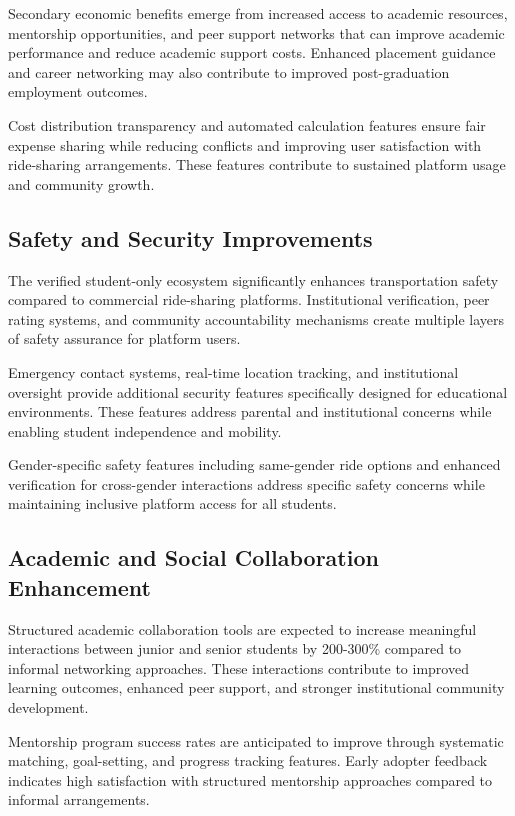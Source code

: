 \documentclass[conference]{IEEEtran}
\begin{document}
Secondary economic benefits emerge from increased access to academic resources, mentorship opportunities, and peer support networks that can improve academic performance and reduce academic support costs. Enhanced placement guidance and career networking may also contribute to improved post-graduation employment outcomes.

Cost distribution transparency and automated calculation features ensure fair expense sharing while reducing conflicts and improving user satisfaction with ride-sharing arrangements. These features contribute to sustained platform usage and community growth.

\subsection{Safety and Security Improvements}

The verified student-only ecosystem significantly enhances transportation safety compared to commercial ride-sharing platforms. Institutional verification, peer rating systems, and community accountability mechanisms create multiple layers of safety assurance for platform users.

Emergency contact systems, real-time location tracking, and institutional oversight provide additional security features specifically designed for educational environments. These features address parental and institutional concerns while enabling student independence and mobility.

Gender-specific safety features including same-gender ride options and enhanced verification for cross-gender interactions address specific safety concerns while maintaining inclusive platform access for all students.

\subsection{Academic and Social Collaboration Enhancement}

Structured academic collaboration tools are expected to increase meaningful interactions between junior and senior students by 200-300\% compared to informal networking approaches. These interactions contribute to improved learning outcomes, enhanced peer support, and stronger institutional community development.

Mentorship program success rates are anticipated to improve through systematic matching, goal-setting, and progress tracking features. Early adopter feedback indicates high satisfaction with structured mentorship approaches compared to informal arrangements.
\end{document}
